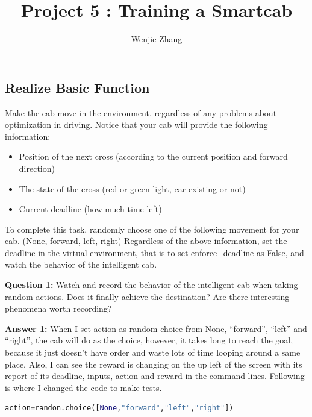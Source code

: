 \documentclass[11pt,a4paper]{article}
\begin{document}
\title{Project 5 : Training a Smartcab}
\author{Wenjie Zhang}
\maketitle

\begin{flushleft}
\section{Realize Basic Function}
\end{flushleft}
Make the cab move in the environment, regardless of any problems about optimization in driving. Notice that your cab will provide the following information:

\begin{itemize}
\item Position of the next cross (according to the current position and forward direction)
\item The state of the cross (red or green light, car existing or not)
\item Current deadline (how much time left)
\end{itemize}

\noindent
To complete this task, randomly choose one of the following movement for your cab. (None, forward, left, right) Regardless of the above information, set the deadline in the virtual environment, that is to set enforce\_deadline as False, and watch the behavior of the intelligent cab.

\vspace{3mm}
\noindent
\textbf{Question 1:}  Watch and record the behavior of the intelligent cab when taking random actions. Does it finally achieve the destination? Are there interesting phenomena worth recording?

\vspace{3mm}
\noindent
\textbf{Answer 1:} When I set action as random choice from None, “forward”, “left” and “right”, the cab will do as the choice, however, it takes long to reach the goal, because it just doesn’t have order and waste lots of time looping around a same place. Also, I can see the reward is changing on the up left of the screen with its report of its deadline, inputs, action and reward in the command lines. Following is where I changed the code to make tests.

\begin{lstlisting}[language={Python}]
action=randon.choice([None,"forward","left","right"])
\end{lstlisting}
\end{document}
